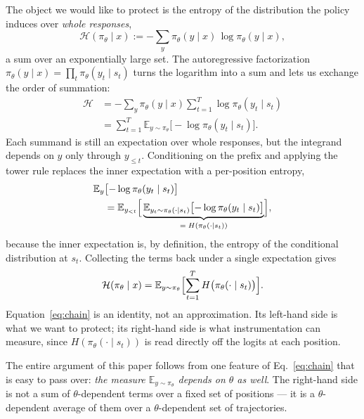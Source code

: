 \documentclass[11pt]{article}
\newcommand{\Htraj}{\mathcal{H}}
\newcommand{\E}{\mathbb{E}}
\newcommand{\pit}{\pi_{\theta}}
\begin{document}
The object we would like to protect is the entropy of the distribution the policy
induces over \emph{whole responses},
%
\begin{equation}
\Htraj(\pit \mid x) := -\sum_{y} \pit(y \mid x)\, \log \pit(y \mid x),
\label{eq:Hdef}
\end{equation}
%
a sum over an exponentially large set. The autoregressive factorization
$\pit(y \mid x) = \prod_t \pit(y_t \mid s_t)$ turns the logarithm into a sum and
lets us exchange the order of summation:
%
\begin{equation}
\begin{split}
\Htraj
&= -\sum_{y} \pit(y \mid x) \sum_{t=1}^{T} \log \pit(y_t \mid s_t)\\
&= \sum_{t=1}^{T} \E_{y \sim \pit}\bigl[-\log \pit(y_t \mid s_t)\bigr].
\end{split}
\label{eq:chainstep}
\end{equation}
%
Each summand is still an expectation over whole responses, but the integrand depends
on $y$ only through $y_{\le t}$. Conditioning on the prefix and applying the tower
rule replaces the inner expectation with a per-position entropy,
%
\begin{equation*}
\begin{split}
\E_{y}&\bigl[-\log \pit(y_t \mid s_t)\bigr]\\
&= \E_{y_{<t}}\Bigl[\,\underbrace{\E_{y_t \sim \pit(\cdot \mid s_t)}\bigl[-\log \pit(y_t \mid s_t)\bigr]}_{= \; H(\pit(\cdot \mid s_t))}\Bigr],
\end{split}
\end{equation*}
%
because the inner expectation is, by definition, the entropy of the conditional
distribution at $s_t$. Collecting the terms back under a single expectation gives
%
\begin{equation}
\Htraj(\pit \mid x)
= \E_{y \sim \pit}\Bigl[\sum_{t=1}^{T} H\bigl(\pit(\cdot \mid s_t)\bigr)\Bigr].
\label{eq:chain-app}
\end{equation}
%
Equation~\eqref{eq:chain} is an identity, not an approximation. Its left-hand side
is what we want to protect; its right-hand side is what instrumentation can measure,
since $H(\pit(\cdot \mid s_t))$ is read directly off the logits at each position.

The entire argument of this paper follows from one feature of
Eq.~\eqref{eq:chain} that is easy to pass over: \emph{the measure
$\E_{y \sim \pit}$ depends on $\theta$ as well}. The right-hand side is not a sum of
$\theta$-dependent terms over a fixed set of positions --- it is a $\theta$-dependent
average of them over a $\theta$-dependent set of trajectories.
\end{document}
